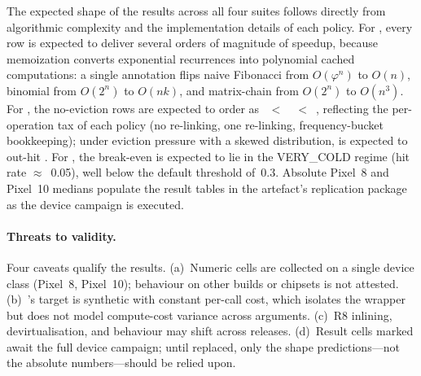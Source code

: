 The expected shape of the results across all four suites follows directly from algorithmic complexity and the implementation details of each policy. For , every row is expected to deliver several orders of magnitude of speedup, because memoization converts exponential recurrences into polynomial cached computations: a single  annotation flips naive Fibonacci from $O(\varphi^n)$ to $O(n)$, binomial from $O(2^n)$ to $O(nk)$, and matrix-chain from $O(2^n)$ to $O(n^3)$. For , the no-eviction rows are expected to order as \fifo~$<$~\lru~$<$~\lfu, reflecting the per-operation tax of each policy (no re-linking, one re-linking, frequency-bucket bookkeeping); under eviction pressure with a skewed distribution, \lfu is expected to out-hit \lru. For , the break-even is expected to lie in the VERY\_COLD regime (hit rate $\approx$~0.05), well below the default  threshold of~0.3. Absolute Pixel~8 and Pixel~10 medians populate the result tables in the artefact's replication package as the device campaign is executed.

\paragraph{Threats to validity.} Four caveats qualify the results. (a)~Numeric cells are collected on a single device class (Pixel~8, Pixel~10); behaviour on other \art builds or chipsets is not attested. (b)~'s target is synthetic with constant per-call cost, which isolates the wrapper but does not model compute-cost variance across arguments. (c)~R8 inlining, devirtualisation, and \dce behaviour may shift across releases. (d)~Result cells marked \pending{} await the full device campaign; until replaced, only the shape predictions---not the absolute numbers---should be relied upon.
